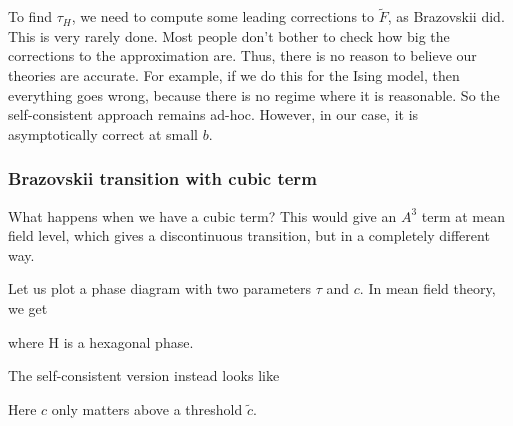 \documentclass[a4paper]{article}
\begin{document}
To find $\tau_H$, we need to compute some leading corrections to $\tilde{F}$, as Brazovskii did. This is very rarely done. Most people don't bother to check how big the corrections to the approximation are. Thus, there is no reason to believe our theories are accurate. For example, if we do this for the Ising model, then everything goes wrong, because there is no regime where it is reasonable. So the self-consistent approach remains ad-hoc. However, in our case, it is asymptotically correct at small $b$.

\subsubsection*{Brazovskii transition with cubic term}
What happens when we have a cubic term? This would give an $A^3$ term at mean field level, which gives a discontinuous transition, but in a completely different way.

Let us plot a phase diagram with two parameters $\tau$ and $c$. In mean field theory, we get
\begin{center}
\end{center}
where H is a hexagonal phase.

The self-consistent version instead looks like
\begin{center}
\end{center}
Here $c$ only matters above a threshold $\tilde{c}$.
\end{document}
